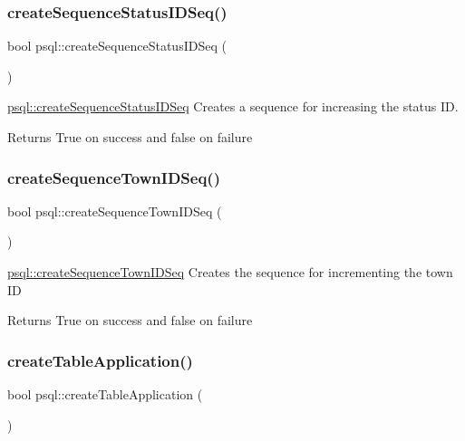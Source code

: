 \subsubsection{\texorpdfstring{create\+Sequence\+Status\+I\+D\+Seq()}{createSequenceStatusIDSeq()}}
{\footnotesize\ttfamily bool psql\+::create\+Sequence\+Status\+I\+D\+Seq (\begin{DoxyParamCaption}{ }\end{DoxyParamCaption})}



\mbox{\hyperlink{classpsql_ae882aa80b2d629383fc2e60aecfd421a}{psql\+::create\+Sequence\+Status\+I\+D\+Seq}} Creates a sequence for increasing the status ID. 

\begin{DoxyReturn}{Returns}
True on success and false on failure 
\end{DoxyReturn}
\mbox{\label{classpsql_a6ce21cb5a1e77cb0c280e2932d2b557d}} 
\subsubsection{\texorpdfstring{create\+Sequence\+Town\+I\+D\+Seq()}{createSequenceTownIDSeq()}}
{\footnotesize\ttfamily bool psql\+::create\+Sequence\+Town\+I\+D\+Seq (\begin{DoxyParamCaption}{ }\end{DoxyParamCaption})}



\mbox{\hyperlink{classpsql_a6ce21cb5a1e77cb0c280e2932d2b557d}{psql\+::create\+Sequence\+Town\+I\+D\+Seq}} Creates the sequence for incrementing the town ID 

\begin{DoxyReturn}{Returns}
True on success and false on failure 
\end{DoxyReturn}
\mbox{\label{classpsql_a36f6a197a2214b9c71cfcd620334835d}} 
\subsubsection{\texorpdfstring{create\+Table\+Application()}{createTableApplication()}}
{\footnotesize\ttfamily bool psql\+::create\+Table\+Application (\begin{DoxyParamCaption}{ }\end{DoxyParamCaption})}



